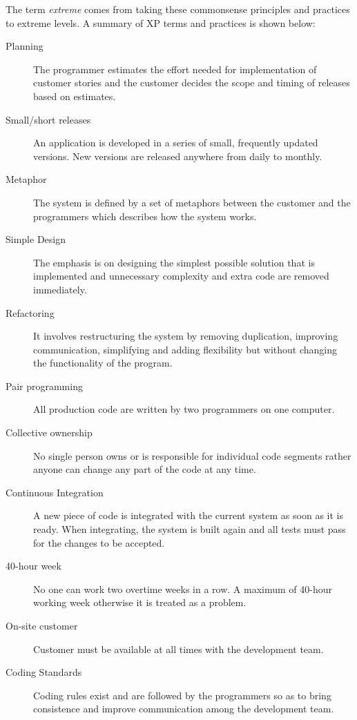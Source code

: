 The term \emph{extreme} comes from taking these commonsense principles and
practices to extreme levels. A summary of XP terms and practices is shown
below:~\cite{four}

\begin{description}

   \item[Planning] The programmer estimates the effort needed for
           implementation of customer stories and the customer decides the
           scope and timing of releases based on estimates. 
   \item[Small/short releases] An application is developed in a series of
           small, frequently updated versions. New versions are released
           anywhere from daily to monthly. 
   \item[Metaphor]
           The system is defined by a set of metaphors between the customer 
           and the programmers which describes how the system works. 
   \item[Simple Design] The emphasis is on designing the simplest possible solution that
is implemented and unnecessary complexity and extra code are removed immediately. 
   \item[Refactoring] It involves restructuring the system by removing duplication,
improving communication, simplifying and adding flexibility but without changing the functionality of the program.
   \item[Pair programming] All production code are written by two programmers on one
computer. 
   \item[Collective ownership] No single person owns or is responsible for individual code
segments rather anyone can change any part of the code at any time. 
   \item[Continuous Integration] A new piece of code is integrated with the current
system as soon as it is ready. When integrating, the system is built again and all tests must pass for the changes to be accepted. 
   \item[40-hour week] No one can work two overtime weeks in a row. A maximum of
40-hour working week otherwise it is treated as a problem. 
   \item[On-site customer] Customer must be available at all times with the development
team. 
   \item[Coding Standards] Coding rules exist and are followed by the programmers so
as to bring consistence and improve communication among the development team.~\cite{one}

\end{description}

